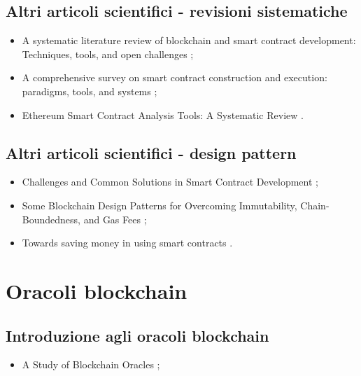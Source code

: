 \subsection*{Altri articoli scientifici - revisioni sistematiche}
\begin{itemize}

\item A systematic literature review of blockchain and smart contract development: Techniques, tools, and open challenges \cite{vacca2021literature};

\item A comprehensive survey on smart contract construction and execution: paradigms, tools, and systems \cite{hu2021survey};

\item Ethereum Smart Contract Analysis Tools: A Systematic Review \cite{kushwaha2022tools}.

\end{itemize}

\subsection*{Altri articoli scientifici - design pattern}
\begin{itemize}

\item Challenges and Common Solutions in Smart Contract Development \cite{kannengiesser2022challanges};

\item Some Blockchain Design Patterns for Overcoming Immutability, Chain-Boundedness, and Gas Fees \cite{mandarino2022patterns};

\item Towards saving money in using smart contracts \cite{chen2018gas}.

\end{itemize}

\section*{Oracoli blockchain}

\subsection*{Introduzione agli oracoli blockchain}
\begin{itemize}

\item A Study of Blockchain Oracles \cite{beniiche2020oracle};

\end{itemize}

